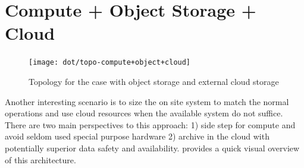 \documentclass{../../template/esiwace-report}
\begin{document}



\section{Compute + Object Storage + Cloud}
\label{sec:compute + objects + cloud}

\begin{figure}
	\centering
	\texttt{[image: dot/topo-compute+object+cloud]}
	\caption{Topology for the case with object storage and external cloud storage}
	\label{fig:topology compute + objects + cloud}
\end{figure}


Another interesting scenario is to size the on site system to match the normal operations and use cloud resources when the available system do not suffice. There are two main perspectives to this approach: 1) side step for compute and avoid seldom used special purpose hardware 2) archive in the cloud with potentially superior data safety and availability.
 provides a quick visual overview of this architecture.
\end{document}
